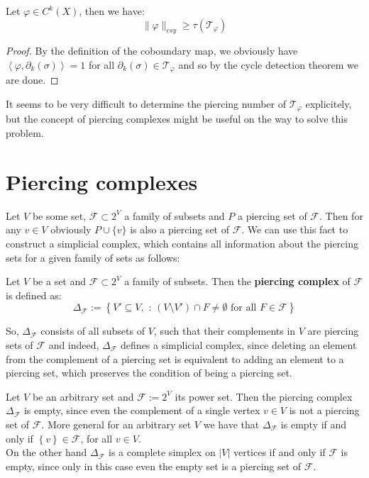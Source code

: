\begin{prop}
Let \(\varphi\in C^k(X)\), then we have:
\[
\|\varphi\|_{csy}\geq\tau(\mathcal{T}_{\varphi})
\]
\begin{proof}
By the definition of the coboundary map, we obviously have\\
\(\left\langle\varphi,\partial_k(\sigma)\right\rangle=1\) for all \(\partial_k(\sigma)\in\mathcal{T}_{\varphi}\) and so by the cycle detection theorem we are done.
\end{proof}
\end{prop}

It seems to be very difficult to determine the piercing number of \(\mathcal{T}_{\varphi}\) explicitely, but the concept of piercing complexes might be useful on the way to solve this problem.

\section{Piercing complexes}

Let \(V\) be some set, \(\mathcal{F}\subset 2^V\) a family of subsets and \(P\) a piercing set of \(\mathcal{F}\). Then for any \(v\in V\) obviously \(P\cup\{v\}\) is also a piercing set of \(\mathcal{F}\). We can use this fact to construct a simplicial complex, which contains all information about the piercing sets for a given family of sets as follows:

\begin{defi}
Let \(V\) be a set and \(\mathcal{F}\subset 2^V\) a family of subsets. Then the \textbf{piercing complex} of \(\mathcal{F}\) is defined as:
\[
\Delta_{\mathcal{F}}:=\left\{V'\subseteq V,\text{ : }(V\setminus V')\cap F\neq\emptyset\text{ for all }F\in\mathcal{F}\right\}
\]
\end{defi}
So, \(\Delta_{\mathcal{F}}\) consists of all subsets of \(V\), such that their complements in \(V\) are piercing sets of \(\mathcal{F}\) and indeed, \(\Delta_{\mathcal{F}}\) defines a simplicial complex, since deleting an element from the complement of a piercing set is equivalent to adding an element to a piercing set, which preserves the condition of being a piercing set.\\

\begin{expl}
Let \(V\) be an arbitrary set and \(\mathcal{F}:=2^V\) its power set. Then the piercing complex \(\Delta_{\mathcal{F}}\) is empty, since even the complement of a single vertex \(v\in V\) is not a piercing set of \(\mathcal{F}\). More general for an arbitrary set \(V\) we have that \(\Delta_{\mathcal{F}}\) is empty if and only if \(\left\{v\right\}\in\mathcal{F}\), for all \(v\in V\).\\
On the other hand \(\Delta_{\mathcal{F}}\) is a complete simplex on \(\left|V\right|\) vertices if and only if \(\mathcal{F}\) is empty, since only in this case even the empty set is a piercing set of \(\mathcal{F}\).
\end{expl}

